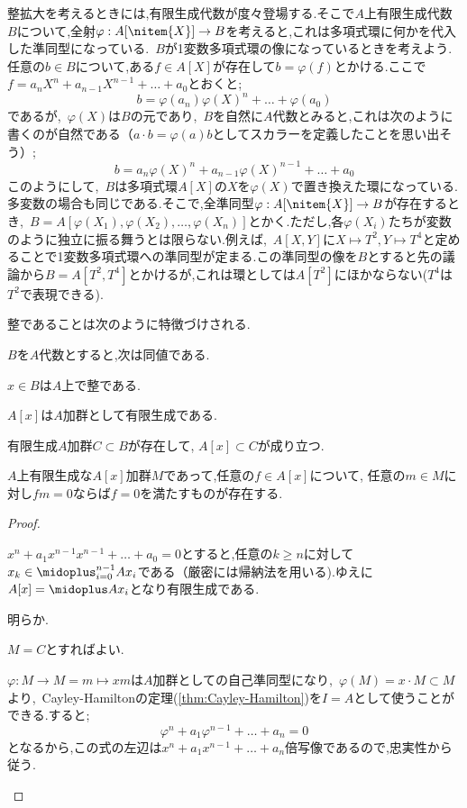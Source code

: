 整拡大を考えるときには,有限生成代数が度々登場する.そこで$A$上有限生成代数$B$について,全射$\varphi:A[\nitem{X}]\to B$を考えると,これは多項式環に何かを代入した準同型になっている.~$B$が1変数多項式環の像になっているときを考えよう.任意の$b\in B$について,ある$f\in A[X]$が存在して$b=\varphi(f)$とかける.ここで$f=a_nX^n+a_{n-1}X^{n-1}+\dots+a_0$とおくと;
\[b=\varphi(a_n)\varphi(X)^n+\dots+\varphi(a_0)\]
であるが,~$\varphi(X)$は$B$の元であり,~$B$を自然に$A$代数とみると,これは次のように書くのが自然である（$a\cdot b=\varphi(a)b$としてスカラーを定義したことを思い出そう）;
\[b=a_n\varphi(X)^n+a_{n-1}\varphi(X)^{n-1}+\dots+a_0\]
このようにして,~$B$は多項式環$A[X]$の$X$を$\varphi(X)$で置き換えた環になっている.多変数の場合も同じである.そこで,全準同型$\varphi:A[\nitem{X}]\to B$が存在するとき,~$B=A[\varphi(X_1),\varphi(X_2),\dots,\varphi(X_n)]$とかく.ただし,各$\varphi(X_i)$たちが変数のように独立に振る舞うとは限らない.例えば,~$A[X,Y]$に$X\mapsto T^2,Y\mapsto T^4$と定めることで1変数多項式環への準同型が定まる.この準同型の像を$B$とすると先の議論から$B=A[T^2,T^4]$とかけるが,これは環としては$A[T^2]$にほかならない($T^4$は$T^2$で表現できる).

整であることは次のように特徴づけされる.
\begin{prop}\label{prop:整拡大の特徴づけ}
	$B$を$A$代数とすると,次は同値である.
	\begin{sakura}
		\item	$x\in B$は$A$上で整である.
		\item	$A[x]$は$A$加群として有限生成である.
		\item	有限生成$A$加群$C\subset B$が存在して, $A[x]\subset C$が成り立つ.
		\item	$A$上有限生成な$A[x]$加群$M$であって,任意の$f\in A[x]$について, 任意の$m\in M$に対し$fm=0$ならば$f=0$を満たすものが存在する.
	\end{sakura}
\end{prop}
\begin{proof}
	\begin{eqv}[4]
		\item $x^n+a_1x^{n-1}x^{n-1}+\dots+a_0=0$とすると,任意の$k\geq n$に対して$x_k\in \midoplus_{i=0}^{n-1}Ax_i$である（厳密には帰納法を用いる).ゆえに$A[x]=\midoplus Ax_i$となり有限生成である.
		
		\item 明らか. 
		\item $M=C$とすればよい.
		\item $\varphi:M\to M=m\mapsto xm$は$A$加群としての自己準同型になり,~$\varphi(M)=x\cdot M\subset M$より,~Cayley-Hamiltonの定理(\ref{thm:Cayley-Hamilton})を$I=A$として使うことができる.すると;
		\[\varphi^n+a_1\varphi^{n-1}+\dots+a_n=0\]
		となるから,この式の左辺は$x^n+a_1x^{n-1}+\dots+a_n$倍写像であるので,忠実性から従う.
	\end{eqv}
\end{proof}

